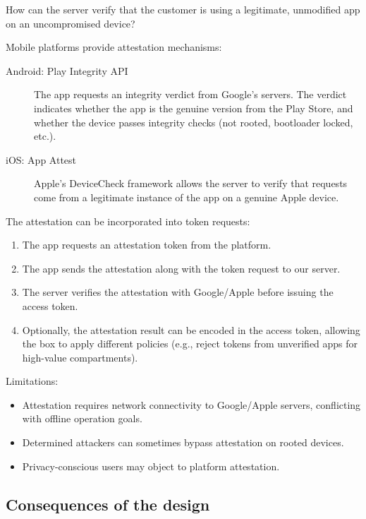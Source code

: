 \begin{exercise}
  How can the server verify that the customer is using a legitimate, 
  unmodified app on an uncompromised device?
\end{exercise}

Mobile platforms provide attestation mechanisms:
\begin{description}
  \item[Android: Play Integrity API] The app requests an integrity verdict from 
    Google's servers.
    The verdict indicates whether the app is the genuine version from the Play
    Store, and whether the device passes integrity checks (not rooted,
    bootloader locked, etc.).
  \item[iOS: App Attest] Apple's DeviceCheck framework allows the server to 
    verify that requests come from a legitimate instance of the app on a 
    genuine Apple device.
\end{description}

The attestation can be incorporated into token requests:
\begin{enumerate}
  \item The app requests an attestation token from the platform.
  \item The app sends the attestation along with the token request to our 
    server.
  \item The server verifies the attestation with Google/Apple before issuing 
    the access token.
  \item Optionally, the attestation result can be encoded in the access token, 
    allowing the box to apply different policies (e.g., reject tokens from 
    unverified apps for high-value compartments).
\end{enumerate}

Limitations:
\begin{itemize}
  \item Attestation requires network connectivity to Google/Apple servers, 
    conflicting with offline operation goals.
  \item Determined attackers can sometimes bypass attestation on rooted 
    devices.
  \item Privacy-conscious users may object to platform attestation.
\end{itemize}

\subsection{Consequences of the design}

